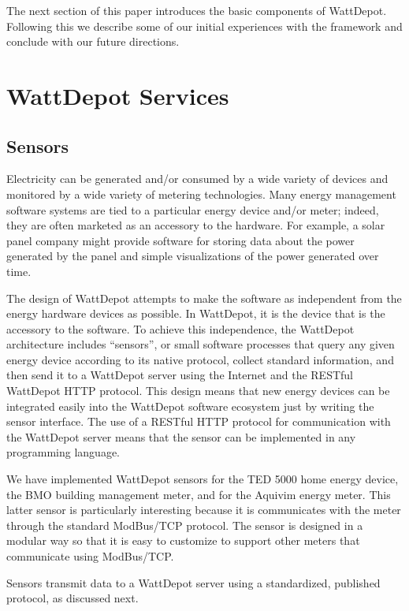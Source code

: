 \documentclass[conference,compsoc]{IEEEtran}
\begin{document}
The next section of this paper introduces the basic components of
WattDepot. Following this we describe some of our initial experiences with
the framework and conclude with our future directions. 

\section{WattDepot Services}

\subsection{Sensors}

Electricity can be generated and/or consumed by a wide variety of devices
and monitored by a wide variety of metering technologies.  Many energy
management software systems are tied to a particular energy device and/or
meter; indeed, they are often marketed as an accessory to the hardware.  For
example, a solar panel company might provide software for storing data
about the power generated by the panel and simple visualizations of the
power generated over time.

The design of WattDepot attempts to make the software as independent from
the energy hardware devices as possible.  In WattDepot, it is the device
that is the accessory to the software.  To achieve this independence, the
WattDepot architecture includes ``sensors'', or small software processes
that query any given energy device according to its native protocol,
collect standard information, and then send it to a WattDepot server using
the Internet and the RESTful WattDepot HTTP protocol.  This design means
that new energy devices can be integrated easily into the WattDepot
software ecosystem just by writing the sensor interface.  The use of a
RESTful HTTP protocol for communication with the WattDepot server means
that the sensor can be implemented in any programming language.

We have implemented WattDepot sensors for the TED 5000 home energy device, 
the BMO building management meter, and for the Aquivim energy meter. This
latter sensor is particularly interesting because it is communicates with the
meter through the standard ModBus/TCP protocol.  The sensor is designed in 
a modular way so that it is easy to customize to support other meters that 
communicate using ModBus/TCP.

Sensors transmit data to a WattDepot server using a standardized, published
protocol, as discussed next.
\end{document}
